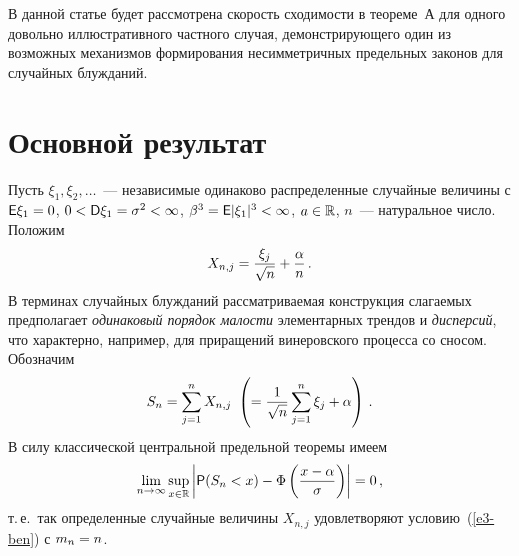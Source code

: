 \begin{multicols}{2}
\smallskip

В данной статье будет рассмотрена скорость сходимости в теореме~А
для одного довольно ил\-люст\-ра\-тив\-но\-го частного случая,
демонстрирующего один из возможных механизмов формирования
несимметричных предельных законов для случайных блужданий.

\section{Основной результат}

Пусть $\xi_1,\xi_2,\ldots$~--- независимые одинаково распределенные
случайные величины с ${\sf E}\xi_1\hm=0$, $0\hm<{\sf
D}\xi_1\hm=\sigma^2<\infty$, $\beta^3\hm={\sf E}|\xi_1|^3\hm<\infty$,
$a\hm\in\r$, $n$~--- натуральное число. Положим
$$
X_{n,j}=\displaystyle\frac{\displaystyle \xi_j\mathstrut}{\displaystyle \sqrt{n}\mathstrut}+\displaystyle\frac{\displaystyle \alpha\mathstrut}{\displaystyle n\mathstrut}\,.
$$
В терминах случайных блужданий рассматриваемая конструкция слагаемых
предполагает {\it одинаковый порядок малости} элементарных трендов и
{\it дис\-пер\-сий}, что характерно, например, для приращений
винеровского процесса со сносом. Обозначим
$$
S_n=\sum\limits_{j=1}^n X_{n,j}\
\left(=\displaystyle\frac{\displaystyle 1\mathstrut}{\displaystyle \sqrt{n}\mathstrut}\sum\limits_{j=1}^n\xi_j+\alpha\right)\,.
$$
В силу классической центральной предельной теоремы имеем
$$
\lim_{n\to\infty}\sup\limits_{x\in\mathbb{R}}\left\vert{\sf
P}(S_n<x)-\Phi\left(\displaystyle\frac{\displaystyle x-\alpha\mathstrut}{\displaystyle \sigma\mathstrut}\right)\right\vert=0\,,
$$
т.\,е.\ так определенные случайные величины $X_{n,j}$ удовлетворяют
условию~(\ref{e3-ben}) с $m_n\hm=n$.


\end{multicols}
